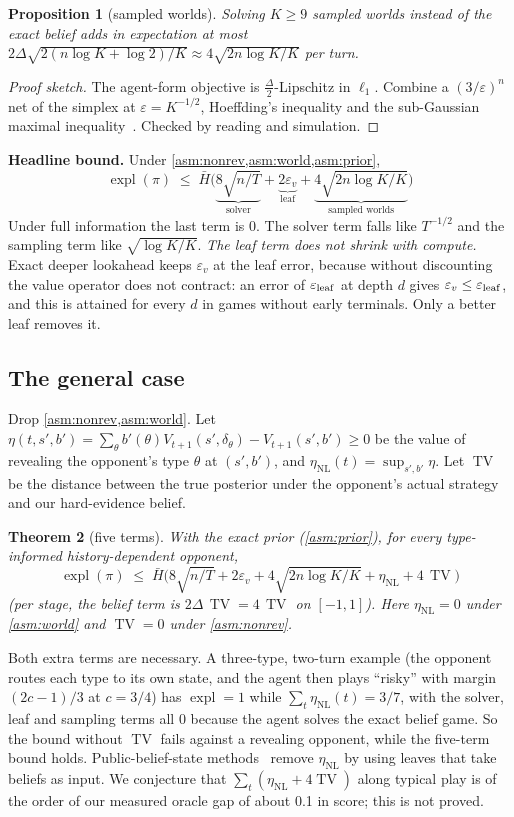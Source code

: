 \documentclass[10pt]{article}
\theoremstyle{plain}
\newtheorem{theorem}{Theorem}
\newtheorem{proposition}[theorem]{Proposition}
\theoremstyle{definition}
\theoremstyle{remark}
\newcommand{\Hbar}{\bar H}
\newcommand{\epsv}{\varepsilon_v}
\newcommand{\etaNL}{\eta_{\mathrm{NL}}}
\DeclareMathOperator{\expl}{expl}
\DeclareMathOperator{\TV}{TV}
\begin{document}
\begin{proposition}[sampled worlds]\label{prop:K}
Solving $K\ge9$ sampled worlds instead of the exact belief adds in expectation at most $2\Delta\sqrt{2(n\log K+\log2)/K}\approx4\sqrt{2n\log K/K}$ per turn.
\end{proposition}
\begin{proof}[Proof sketch]
The agent-form objective is $\frac\Delta2$-Lipschitz in $\ell_1$. Combine a $(3/\varepsilon)^n$ net of the simplex at $\varepsilon=K^{-1/2}$, Hoeffding's inequality and the sub-Gaussian maximal inequality~\cite{BLM13}. Checked by reading and simulation.
\end{proof}

\textbf{Headline bound.} Under \cref{asm:nonrev,asm:world,asm:prior},
\begin{equation}\label{eq:headline}
\boxed{\;\expl(\pi)\;\le\;\Hbar\Big(\underbrace{8\sqrt{n/T}}_{\text{solver}}+\underbrace{2\epsv}_{\text{leaf}}+\underbrace{4\sqrt{2n\log K/K}}_{\text{sampled worlds}}\Big)\;}
\end{equation}
Under full information the last term is 0. The solver term falls like $T^{-1/2}$ and the sampling term like $\sqrt{\log K/K}$. \emph{The leaf term does not shrink with compute.} Exact deeper lookahead keeps $\epsv$ at the leaf error, because without discounting the value operator does not contract: an error of $\varepsilon_{\rm leaf}$ at depth $d$ gives $\epsv\le\varepsilon_{\rm leaf}$, and this is attained for every $d$ in games without early terminals. Only a better leaf removes it.

\subsection{The general case}
\label{sec:general}
Drop \cref{asm:nonrev,asm:world}. Let $\eta(t,s',b')=\sum_\theta b'(\theta)V_{t+1}(s',\delta_\theta)-V_{t+1}(s',b')\ge0$ be the value of revealing the opponent's type $\theta$ at $(s',b')$, and $\etaNL(t)=\sup_{s',b'}\eta$. Let $\TV$ be the distance between the true posterior under the opponent's actual strategy and our hard-evidence belief.
\begin{theorem}[five terms]\label{thm:C}
With the exact prior (\cref{asm:prior}), for every type-informed history-dependent opponent,
\[
\expl(\pi)\;\le\;\Hbar\Big(8\sqrt{n/T}+2\epsv+4\sqrt{2n\log K/K}+\etaNL+4\,\TV\Big)
\]
(per stage, the belief term is $2\Delta\,\TV=4\,\TV$ on $[-1,1]$). Here $\etaNL=0$ under \cref{asm:world} and $\TV=0$ under \cref{asm:nonrev}.
\end{theorem}
Both extra terms are necessary. A three-type, two-turn example (the opponent routes each type to its own state, and the agent then plays ``risky'' with margin $(2c-1)/3$ at $c=3/4$) has $\expl=1$ while $\sum_t\etaNL(t)=3/7$, with the solver, leaf and sampling terms all 0 because the agent solves the exact belief game. So the bound without $\TV$ fails against a revealing opponent, while the five-term bound holds. Public-belief-state methods~\cite{CFRD,Mor17,Bro20} remove $\etaNL$ by using leaves that take beliefs as input. We conjecture that $\sum_t(\etaNL+4\TV)$ along typical play is of the order of our measured oracle gap of about 0.1 in score; this is not proved.
\end{document}
